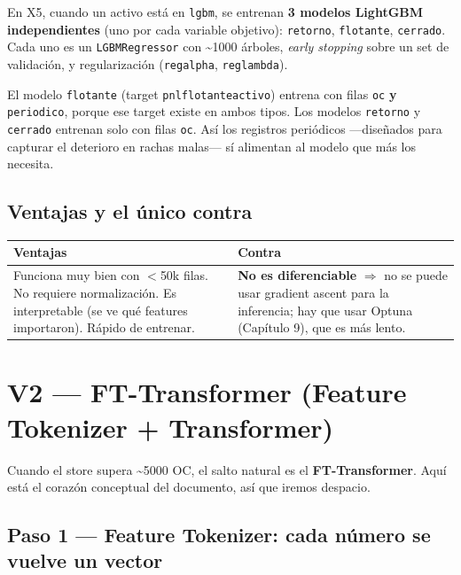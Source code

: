 \documentclass[11pt,a4paper]{report}
\newcommand{\code}[1]{\texttt{\def\_{\textunderscore\allowbreak}#1}}
\begin{document}
En X5, cuando un activo está en \code{lgbm}, se entrenan \textbf{3 modelos LightGBM independientes}
(uno por cada variable objetivo): \code{retorno}, \code{flotante}, \code{cerrado}. Cada uno es un
\code{LGBMRegressor} con \textasciitilde1000 árboles, \emph{early stopping} sobre un set de
validación, y regularización (\code{reg\_alpha}, \code{reg\_lambda}).

\begin{nota}
El modelo \code{flotante} (target \code{pnl\_flotante\_activo}) entrena con filas \code{oc}
\textbf{y} \code{periodico}, porque ese target existe en ambos tipos. Los modelos \code{retorno}
y \code{cerrado} entrenan solo con filas \code{oc}. Así los registros periódicos —diseñados para
capturar el deterioro en rachas malas— sí alimentan al modelo que más los necesita.
\end{nota}

\section{Ventajas y el único contra}

\begin{center}\small
\begin{tabular}{@{}p{7.5cm}p{7.5cm}@{}}
\toprule
\textbf{Ventajas} & \textbf{Contra} \\
\midrule
Funciona muy bien con $<$50k filas. No requiere normalización. Es interpretable (se ve qué
features importaron). Rápido de entrenar. &
\textbf{No es diferenciable} $\Rightarrow$ no se puede usar gradient ascent para la inferencia;
hay que usar Optuna (Capítulo 9), que es más lento. \\
\bottomrule
\end{tabular}
\end{center}

\chapter{V2 — FT-Transformer (Feature Tokenizer + Transformer)}

Cuando el store supera \textasciitilde5000 OC, el salto natural es el \textbf{FT-Transformer}. Aquí
está el corazón conceptual del documento, así que iremos despacio.

\section{Paso 1 — Feature Tokenizer: cada número se vuelve un vector}
\end{document}
